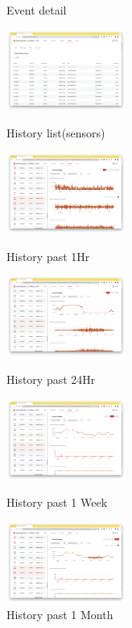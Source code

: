\begin{figure}[!ht]
\begin{fullwidth}
{			\caption*{Event detail}
		}\qquad
		\parbox{0.35\textwidth}{
			\centering
			\includegraphics[width=0.35\textwidth]{images/nvcshm-history-list.png}
			\caption*{History list(sensors)}
		}
		\parbox{0.35\textwidth}{
			\centering
			\includegraphics[width=0.35\textwidth]{images/nvcshm-history-1hr.png}
			\caption*{History past 1Hr}
		}\qquad
		\parbox{0.35\textwidth}{
			\centering
			\includegraphics[width=0.35\textwidth]{images/nvcshm-history-24hr.png}
			\caption*{History past 24Hr}
		}\qquad
		\parbox{0.35\textwidth}{
			\centering
			\includegraphics[width=0.35\textwidth]{images/nvcshm-history-1w.png}
			\caption*{History past 1 Week}
		}\qquad
		\parbox{0.35\textwidth}{
			\centering
			\includegraphics[width=0.35\textwidth]{images/nvcshm-history-1m.png}
			\caption*{History past 1 Month}
		}
	\end{fullwidth}
\end{figure}